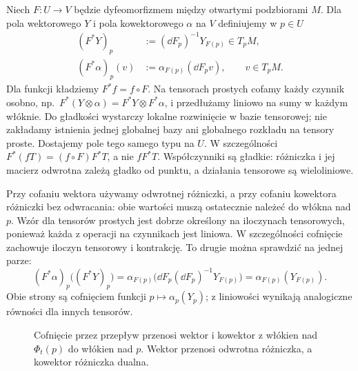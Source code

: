 \begin{definicja}
\label{def:cofniecie-tensora}
Niech $F\colon U\to V$ będzie dyfeomorfizmem między
otwartymi podzbiorami $M$. Dla pola wektorowego $Y$ i
pola kowektorowego $\alpha$ na $V$ definiujemy w $p\in U$
\begin{align*}
 (F^*Y)_p&:=(\dd F_p)^{-1}Y_{F(p)}\in T_pM,\\
 (F^*\alpha)_p(v)&:=\alpha_{F(p)}(\dd F_pv),
 \qquad v\in T_pM.
\end{align*}
Dla funkcji kładziemy $F^*f=f\circ F$.
Na tensorach prostych cofamy każdy czynnik osobno,
np.\ $F^*(Y\otimes\alpha)=F^*Y\otimes F^*\alpha$,
i przedłużamy liniowo na sumy w każdym włóknie. Do gładkości
wystarczy lokalne rozwinięcie w bazie tensorowej; nie zakładamy
istnienia jednej globalnej bazy ani globalnego rozkładu na tensory proste.
Dostajemy pole
tego samego typu na $U$. W szczególności
$F^*(fT)=(f\circ F)F^*T$, a nie $fF^*T$.
Współczynniki są gładkie: różniczka i jej macierz odwrotna
zależą gładko od punktu, a działania tensorowe są wieloliniowe.
\end{definicja}

Przy cofaniu wektora używamy odwrotnej różniczki,
a przy cofaniu kowektora różniczki bez odwracania:
obie wartości muszą ostatecznie należeć do włókna nad $p$.
Wzór dla tensorów prostych jest dobrze określony na
iloczynach tensorowych, ponieważ każda z operacji na
czynnikach jest liniowa. W szczególności cofnięcie zachowuje
iloczyn tensorowy i kontrakcję. To drugie można sprawdzić
na jednej parze:
\[
 (F^*\alpha)_p\bigl((F^*Y)_p\bigr)
 =\alpha_{F(p)}\bigl(\dd F_p(\dd F_p)^{-1}Y_{F(p)}\bigr)
 =\alpha_{F(p)}(Y_{F(p)}).
\]
Obie strony są cofnięciem funkcji $p\mapsto\alpha_p(Y_p)$;
z liniowości wynikają analogiczne równości dla innych tensorów.

\begin{figure}[H]
\centering
{}
\caption{Cofnięcie przez przepływ przenosi wektor i kowektor
z włókien nad $\Phi_t(p)$ do włókien nad $p$.
Wektor przenosi odwrotna różniczka, a kowektor różniczka dualna.}
\label{fig:lie-tensor-transport}
\end{figure}

